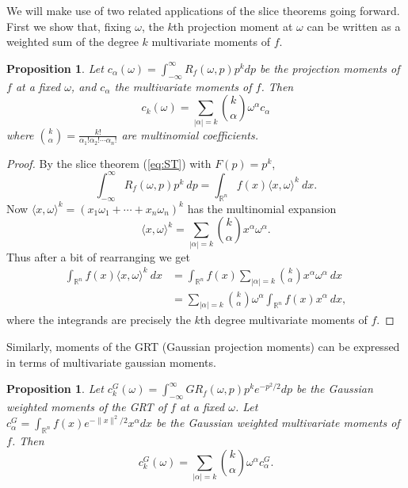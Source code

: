 \documentclass{amsart}
\newtheorem{proposition}[theorem]{Proposition}
\theoremstyle{remark}
\numberwithin{equation}{section}
\newcommand{\RR}{\mathbb{R}}
\begin{document}
We will make use of two related applications of the slice theorems going forward. First we show that, fixing $\omega$, the $k$th projection moment at $\omega$ can be written as a weighted sum of the degree $k$ multivariate moments of $f$. 
\begin{proposition}
    Let $c_\alpha (\omega) = \int_{-\infty}^\infty R_f(\omega, p) p^k dp$ be the projection moments of $f$ at a fixed $\omega$, and $c_\alpha$ the multivariate moments of $f$. Then
    \[
        c_k(\omega) = \sum_{|\alpha| = k}\binom{k}{\alpha} \omega^\alpha c_\alpha
    \]
    where $\binom{k}{\alpha} = \frac{k!}{\alpha_1! \alpha_2! \cdots \alpha_n!}$ are multinomial coefficients.
\end{proposition}
\begin{proof}
By the slice theorem (\ref{eq:ST}) with $F(p) = p^k$,
\[
    \int_{-\infty}^\infty R_f(\omega, p) p^k ~dp 
    = \int_{\RR^n} f(x) \langle x, \omega \rangle^k ~dx.
\]
Now $\langle x, \omega \rangle^k = (x_1 \omega_1 + \cdots + x_n \omega_n)^k$ has the multinomial expansion
\[
    \langle x, \omega \rangle^k = \sum_{|\alpha| = k}\binom{k}{\alpha} x^\alpha\omega^\alpha.
\]
Thus after a bit of rearranging we get
\begin{align*}
    \int_{\RR^n} f(x) \langle x, \omega \rangle^k ~dx
    &= \int_{\RR^n} f(x) \sum_{|\alpha| = k}\binom{k}{\alpha} x^\alpha \omega^\alpha ~dx \\
    &= \sum_{|\alpha| = k}\binom{k}{\alpha} \omega^\alpha \int_{\RR^n} f(x) x^\alpha ~dx,
\end{align*}
where the integrands are precisely the $k$th degree multivariate moments of $f$.
\end{proof}
Similarly, moments of the GRT (Gaussian projection moments) can be expressed in terms of multivariate gaussian moments.
\begin{proposition}
Let $c_k^G(\omega) = \int_{-\infty}^\infty GR_f(\omega, p) p^k e^{-p^2/2} dp$ be the Gaussian weighted moments of the GRT of $f$ at a fixed $\omega$. Let $c^G_\alpha = \int_{\RR^n} f(x) e^{-\|x\|^2/2} x^\alpha dx$ be the Gaussian weighted multivariate moments of $f$. Then
\[
    c^G_k(\omega) = \sum_{|\alpha| = k}\binom{k}{\alpha} \omega^\alpha c^G_\alpha.
\]
\end{proposition}
\end{document}
